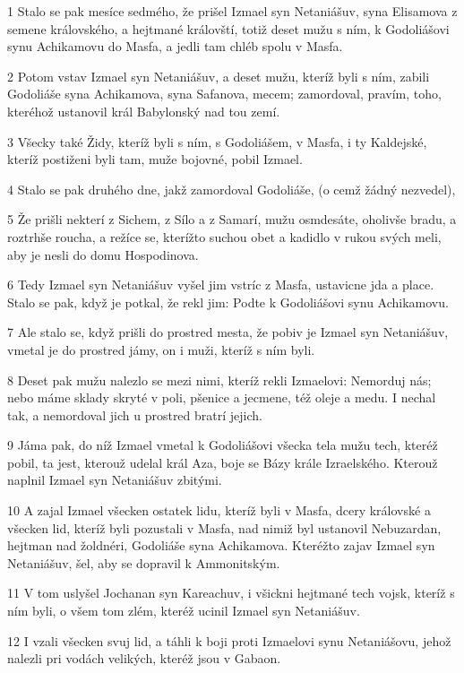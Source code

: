 \par 1 Stalo se pak mesíce sedmého, že prišel Izmael syn Netaniášuv, syna Elisamova z semene královského, a hejtmané královští, totiž deset mužu s ním, k Godoliášovi synu Achikamovu do Masfa, a jedli tam chléb spolu v Masfa.
\par 2 Potom vstav Izmael syn Netaniášuv, a deset mužu, kteríž byli s ním, zabili Godoliáše syna Achikamova, syna Safanova, mecem; zamordoval, pravím, toho, kteréhož ustanovil král Babylonský nad tou zemí.
\par 3 Všecky také Židy, kteríž byli s ním, s Godoliášem, v Masfa, i ty Kaldejské, kteríž postiženi byli tam, muže bojovné, pobil Izmael.
\par 4 Stalo se pak druhého dne, jakž zamordoval Godoliáše, (o cemž žádný nezvedel),
\par 5 Že prišli nekterí z Sichem, z Sílo a z Samarí, mužu osmdesáte, oholivše bradu, a roztrhše roucha, a režíce se, kterížto suchou obet a kadidlo v rukou svých meli, aby je nesli do domu Hospodinova.
\par 6 Tedy Izmael syn Netaniášuv vyšel jim vstríc z Masfa, ustavicne jda a place. Stalo se pak, když je potkal, že rekl jim: Podte k Godoliášovi synu Achikamovu.
\par 7 Ale stalo se, když prišli do prostred mesta, že pobiv je Izmael syn Netaniášuv, vmetal je do prostred jámy, on i muži, kteríž s ním byli.
\par 8 Deset pak mužu nalezlo se mezi nimi, kteríž rekli Izmaelovi: Nemorduj nás; nebo máme sklady skryté v poli, pšenice a jecmene, též oleje a medu. I nechal tak, a nemordoval jich u prostred bratrí jejich.
\par 9 Jáma pak, do níž Izmael vmetal k Godoliášovi všecka tela mužu tech, kteréž pobil, ta jest, kterouž udelal král Aza, boje se Bázy krále Izraelského. Kterouž naplnil Izmael syn Netaniášuv zbitými.
\par 10 A zajal Izmael všecken ostatek lidu, kteríž byli v Masfa, dcery královské a všecken lid, kteríž byli pozustali v Masfa, nad nimiž byl ustanovil Nebuzardan, hejtman nad žoldnéri, Godoliáše syna Achikamova. Kteréžto zajav Izmael syn Netaniášuv, šel, aby se dopravil k Ammonitským.
\par 11 V tom uslyšel Jochanan syn Kareachuv, i všickni hejtmané tech vojsk, kteríž s ním byli, o všem tom zlém, kteréž ucinil Izmael syn Netaniášuv.
\par 12 I vzali všecken svuj lid, a táhli k boji proti Izmaelovi synu Netaniášovu, jehož nalezli pri vodách velikých, kteréž jsou v Gabaon.
